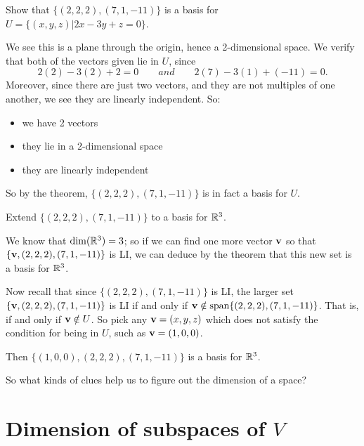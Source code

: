 \begin{myprob} Show that $\{(2,2,2), (7,1,-11)\}$ is a basis for $U = \{(x,y,z) | 2x-3y+z = 0\}$.  

\begin{mysol}  We see this is a plane through the origin, hence a 2-dimensional
space.  We verify that both of the vectors given lie in $U$, since
$$
2(2) -3(2) + 2 = 0 \qquad and \qquad 2(7)-3(1)+(-11) = 0.
$$
Moreover, since there are just two vectors, and they are not multiples
of one another, we see they are linearly independent.  So:
\begin{itemize}
\item we have 2 vectors
\item they lie in a 2-dimensional space
\item they are linearly independent
\end{itemize}
So by the theorem, $\{(2,2,2), (7,1,-11)\}$ is in fact a basis for $U$.
\end{mysol}\end{myprob}

\begin{myprob} Extend $\{(2,2,2), (7,1,-11)\}$ to a basis for $\mathbb{R}^3$.

\begin{mysol} We know that $\dim(\mathbb{R}^3) = 3$; so 
if we can find one more vector $\mathbf{v}$  so that $\{\mathbf{v}, (2,2,2), (7,1,-11)\}$
is LI, we can deduce by the theorem that this new set is a basis for
$\mathbb{R}^3$.

Now recall that since $\{(2,2,2), (7,1,-11)\}$ is LI, the larger
set $\{\mathbf{v}, (2,2,2), (7,1,-11)\}$ is LI if and only if $\mathbf{v} \notin \textrm{span}\{(2,2,2), (7,1,-11)\}$.  That is, if and only if $\mathbf{v} \notin U$.  So pick
any $\mathbf{v}=(x,y,z)$ which does not satisfy the condition for being in $U$,
such as $\mathbf{v} = (1,0,0)$.  

Then $\{(1,0,0), (2,2,2), (7,1,-11)\}$ is a basis for $\mathbb{R}^3$.
\end{mysol}\end{myprob}


So what kinds of clues help us to figure out the dimension of a space?

\section{Dimension of subspaces of $V$}

